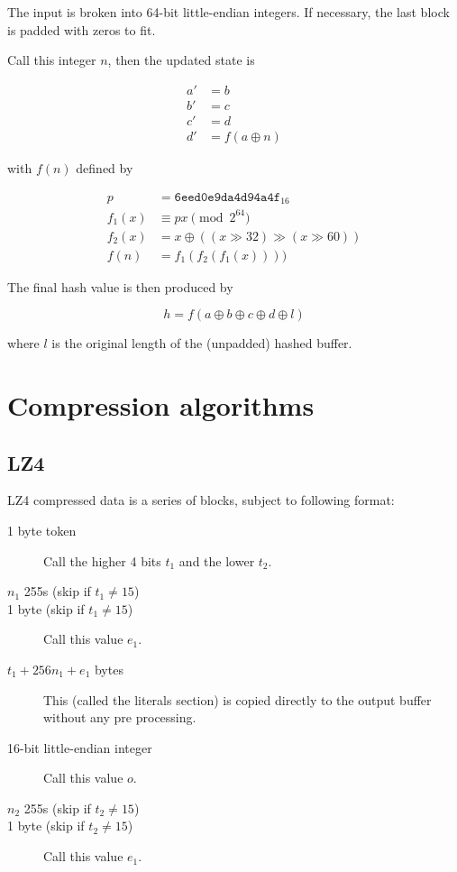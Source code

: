 \documentclass[11pt,a4paper]{report}
\begin{document}
        The input is broken into 64-bit little-endian integers. If necessary,
        the last block is padded with zeros to fit.

        Call this integer $n$, then the updated state is

        \begin{align*}
            a' &= b \\
            b' &= c \\
            c' &= d \\
            d' &= f(a \oplus n)
        \end{align*}

        with $f(n)$ defined by

        \begin{align*}
            p      &=      \texttt{6eed0e9da4d94a4f}_{16} \\
            f_1(x) &\equiv px \pmod{2^{64}} \\
            f_2(x) &=      x \oplus ((x \gg 32) \gg (x \gg 60)) \\
            f(n)   &=      f_1(f_2(f_1(x))))
        \end{align*}

        The final hash value is then produced by

        $$h = f(a \oplus b \oplus c \oplus d \oplus l) $$

        where $l$ is the original length of the (unpadded) hashed buffer.

    \section{Compression algorithms}
        \subsection{LZ4}
        \label{algorithm:lz4}
        LZ4 compressed data is a series of blocks, subject to following format:

        \begin{description}
            \item [1 byte token] Call the higher 4 bits $t_1$ and the lower
                $t_2$.
            \item [$n_1$ 255s (skip if $t_1 \neq 15$)]
            \item [1 byte (skip if $t_1 \neq 15$)] Call this value $e_1$.
            \item [$t_1 + 256n_1 + e_1$ bytes] This (called the literals
                section) is copied directly to the output buffer without any
                pre processing.
            \item [16-bit little-endian integer] Call this value $o$.
            \item [$n_2$ 255s (skip if $t_2 \neq 15$)]
            \item [1 byte (skip if $t_2 \neq 15$)] Call this value $e_1$.
        \end{description}
\end{document}
